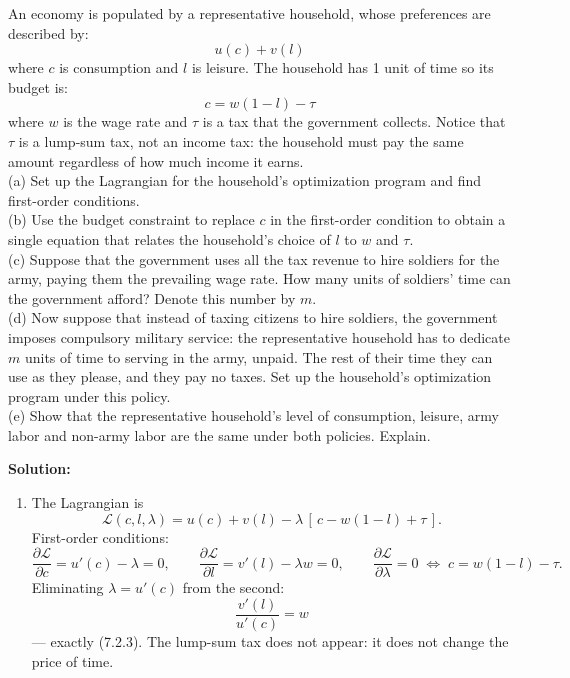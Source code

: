 \documentclass[12pt, letterpaper]{article}
\newcommand{\pd}[2]{\dfrac{\partial #1}{\partial #2}}
\begin{document}
\begin{tcolorbox}[evenbox,title={Problem 7.2 \quad Military Service}]
\begin{tcolorbox}[questionbox]
An economy is populated by a representative household, whose preferences are described by:
\[u(c)+v(l)\]
where $c$ is consumption and $l$ is leisure. The household has 1 unit of time so its budget
is:
\[c=w(1-l)-\tau\]
where $w$ is the wage rate and $\tau$ is a tax that the government collects. Notice that
$\tau$ is a lump-sum tax, not an income tax: the household must pay the same amount
regardless of how much income it earns.\\[3pt]
(a) Set up the Lagrangian for the household's optimization program and find first-order
conditions.\\
(b) Use the budget constraint to replace $c$ in the first-order condition to obtain a single
equation that relates the household's choice of $l$ to $w$ and $\tau$.\\
(c) Suppose that the government uses all the tax revenue to hire soldiers for the army,
paying them the prevailing wage rate. How many units of soldiers' time can the government
afford? Denote this number by $m$.\\
(d) Now suppose that instead of taxing citizens to hire soldiers, the government imposes
compulsory military service: the representative household has to dedicate $m$ units of time
to serving in the army, unpaid. The rest of their time they can use as they please, and they
pay no taxes. Set up the household's optimization program under this policy.\\
(e) Show that the representative household's level of consumption, leisure, army labor and
non-army labor are the same under both policies. Explain.
\end{tcolorbox}

\textbf{Solution:}

\begin{enumerate}
\item The Lagrangian is
\[
\mathcal L(c,l,\lambda)=u(c)+v(l)-\lambda\,[\,c-w(1-l)+\tau\,].
\]
First-order conditions:
\[
\pd{\mathcal L}{c}=u'(c)-\lambda=0,
\qquad
\pd{\mathcal L}{l}=v'(l)-\lambda w=0,
\qquad
\pd{\mathcal L}{\lambda}=0\;\Leftrightarrow\;c=w(1-l)-\tau .
\]
Eliminating $\lambda=u'(c)$ from the second:
\[
\boxed{\;\frac{v'(l)}{u'(c)}=w\;}
\]
--- exactly (7.2.3). The lump-sum tax does not appear: it does not change the price of time.


\end{enumerate}
\end{tcolorbox}
\end{document}
